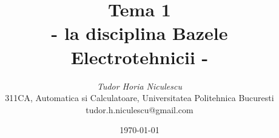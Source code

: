 \documentclass[12pt,twoside]{article}  %
\begin{document}
\title{Tema 1\\
{\small - la disciplina Bazele Electrotehnicii - }}
\author{{\em Tudor Horia Niculescu} \\
 311CA, Automatica si Calculatoare, Universitatea Politehnica Bucuresti \\
tudor.h.niculescu@gmail.com}
\date{\today}  %


\maketitle





\newpage  %
\tableofcontents
\newpage  %

\renewcommand\tablename{Tabelul}  %
\renewcommand\bibname{Referin'te}  %








\newpage
%
\end{document}
